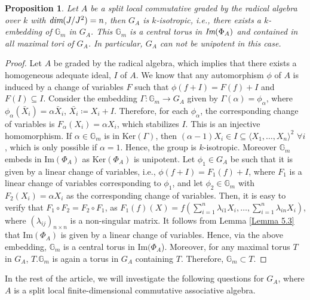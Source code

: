 \documentclass[12pt]{amsart}
\newtheorem{proposition}[theorem]{Proposition}
\theoremstyle{definition}
\numberwithin{equation}{section}
\begin{document}
\vskip2mm
\begin{proposition}\label{Proposition 5.5}
Let $A$ be a split local commutative graded by the radical algebra over $k$ with $\emph{dim}(J/J^2)=n$, then $G_A$ is $k$-isotropic, i.e., there exists a $k$-embedding of $\mathbb{G}_m$ in $G_A$. This $\mathbb{G}_m$ is a central torus in $\emph{\text{Im}}(\Phi_A)$ and contained in all maximal tori of $G_A$. In particular, $G_A$ can not be unipotent in this case.
\end{proposition}
\vskip1mm
\begin{proof}
Let $A$ be graded by the radical algebra, which implies that there exists a homogeneous adequate ideal, $I$ of $A$. We know that any automorphism $\phi$ of $A$ is induced by a change of variables $F$ such that $\phi(f+I)=F(f)+I$ and $F(I)\subseteq I$. Consider the embedding $\Gamma :\mathbb{G}_m\rightarrow G_A$ given by $\Gamma(\alpha)=\phi_{\alpha}$, where $\phi_{\alpha}(\bar X_i)=\alpha \bar X_i$, $\bar{X_i}\coloneq X_i+I$. Therefore, for each $\phi_{\alpha}$, the corresponding change of variables is $F_{\alpha}(X_i)=\alpha X_i$, which stabilizes $I$. This is an injective homomorphism. If $\alpha\in \mathbb{G}_m$ is in $\text{Ker}(\Gamma)$, then $(\alpha-1)X_i\in I\subseteq \langle X_1,\dots,X_n\rangle^2$ $\forall i$, which is only possible if $\alpha=1$. Hence, the group is $k$-isotropic. Moreover $\mathbb{G}_m$ embeds in $\text{Im}(\Phi_A)$ as $\text{Ker}(\Phi_A)$ is unipotent.
\vskip2mm
\noindent
Let $\phi_1\in G_A$ be such that it is given by a linear change of variables, i.e., $\phi(f+I)=F_1(f)+I$, where $F_1$ is a linear change of variables corresponding to $\phi_1$, and let $\phi_2\in \mathbb{G}_m$ with $F_2(X_i)=\alpha X_i$ as the corresponding change of variables. Then, it is easy to verify that $F_1\circ F_2=F_2\circ F_1$, as $F_1(f)(X)=f(\sum_{i=1}^n\lambda_{i1}X_i,\dots,\sum_{i=1}^{n}\lambda_{in}X_i)$, where $(\lambda_{ij})_{n\times n}$ is a non-singular matrix. It follows from Lemma \ref{Lemma 5.3} that $\text{Im}(\Phi_A)$ is given by a linear change of variables. Hence, via the above embedding, $\mathbb{G}_m$ is a central torus in $\text{Im}(\Phi_A$). Moreover, for any maximal torus $T$ in $G_A$, $T.\mathbb{G}_m$ is again a torus in $G_A$ containing $T$. Therefore, $\mathbb{G}_m\subset T$.  
\end{proof}


\vspace{0.2in}
\noindent
In the rest of the article, we will investigate the following questions for $G_A$, where $A$ is a split local finite-dimensional commutative associative algebra.
\end{document}
